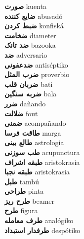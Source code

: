\textbf{ صورت  } kuenta \\
\textbf{ ضایع کننده  } abusadó \\
\textbf{ ضبط کردن  } konfiská \\
\textbf{ ضخامت  } diameter \\
\textbf{ ضد تانک  } bazooka \\
\textbf{ ضد  } adversario \\
\textbf{ ضدعفونی  } antiséptiko \\
\textbf{ ضرب المثل  } proverbio \\
\textbf{ ضربان قلب  } bati \\
\textbf{ ضربه سنگین  } bala \\
\textbf{ ضرر  } dañando \\
\textbf{ ضلالت  } fout \\
\textbf{ ضمنی  } acompañando \\
\textbf{ طاقت فرسا  } marga \\
\textbf{ طالع بینی  } astrologia \\
\textbf{ طب سوزنی  } acupunctura \\
\textbf{ طبقه اشراف  } aristokrasia \\
\textbf{ طبقه نجبا  } aristokrasia \\
\textbf{ طبل  } tambú \\
\textbf{ طراحی  } pinta \\
\textbf{ طرح ریز  } beamer \\
\textbf{ طرح  } figura \\
\textbf{ طرف معامله  } analógiko \\
\textbf{ طرفدار استبداد  } despótiko \\
